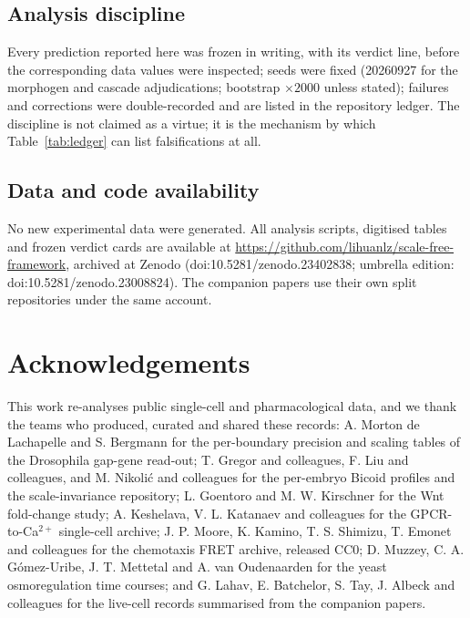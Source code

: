 \documentclass[11pt,a4paper]{article}
\begin{document}
\subsection{Analysis discipline}

Every prediction reported here was frozen in writing, with its verdict line, before the corresponding data values were inspected; seeds were fixed (20260927 for the morphogen and cascade adjudications; bootstrap $\times2000$ unless stated); failures and corrections were double-recorded and are listed in the repository ledger. The discipline is not claimed as a virtue; it is the mechanism by which Table~\ref{tab:ledger} can list falsifications at all.

\subsection{Data and code availability}

No new experimental data were generated. All analysis scripts, digitised tables and frozen verdict cards are available at \url{https://github.com/lihuanlz/scale-free-framework}, archived at Zenodo (doi:10.5281/zenodo.23402838; umbrella edition: doi:10.5281/zenodo.23008824). The companion papers \cite{CompanionP53,CompanionChemo,CompanionGPCR} use their own split repositories under the same account.

\section*{Acknowledgements}

This work re-analyses public single-cell and pharmacological data, and we thank the teams who produced, curated and shared these records: A. Morton de Lachapelle and S. Bergmann for the per-boundary precision and scaling tables of the Drosophila gap-gene read-out; T. Gregor and colleagues, F. Liu and colleagues, and M. Nikoli\'c and colleagues for the per-embryo Bicoid profiles and the scale-invariance repository; L. Goentoro and M. W. Kirschner for the Wnt fold-change study; A. Keshelava, V. L. Katanaev and colleagues for the GPCR-to-Ca$^{2+}$ single-cell archive; J. P. Moore, K. Kamino, T. S. Shimizu, T. Emonet and colleagues for the chemotaxis FRET archive, released CC0; D. Muzzey, C. A. G\'omez-Uribe, J. T. Mettetal and A. van Oudenaarden for the yeast osmoregulation time courses; and G. Lahav, E. Batchelor, S. Tay, J. Albeck and colleagues for the live-cell records summarised from the companion papers.
\end{document}
